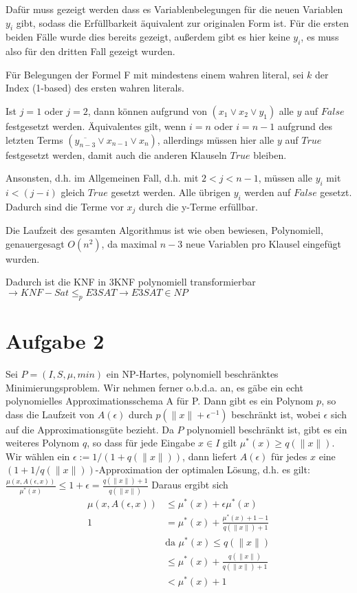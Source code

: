 \documentclass[a4paper,10pt,oneside,reqno]{scrartcl}
\begin{document}
Dafür muss gezeigt werden dass es Variablenbelegungen für die neuen Variablen $y_i$ gibt, sodass die Erfüllbarkeit äquivalent zur originalen Form ist. Für die ersten beiden Fälle wurde dies bereits gezeigt, außerdem gibt es hier keine $y_i$, es muss also für den dritten Fall gezeigt wurden.

Für Belegungen der Formel F mit mindestens einem wahren literal, sei $k$ der Index (1-based) des ersten wahren literals.

Ist $j=1$ oder $j=2$, dann können aufgrund von $(x_1 \vee x_2 \vee y_1)$ alle $y$ auf $False$ festgesetzt werden.
Äquivalentes gilt, wenn $i=n$ oder $i=n-1$ aufgrund des letzten Terms $(\overline{y_{n-3}} \vee x_{n-1} \vee x_{n})$, allerdings müssen hier alle $y$ auf $True$ festgesetzt werden, damit auch die anderen Klauseln $True$ bleiben.

Ansonsten, d.h. im Allgemeinen Fall, d.h. mit $2 < j < n-1$, müssen alle $y_i$ mit $i < (j-i)$ gleich $True$ gesetzt werden. Alle übrigen $y_i$ werden auf $False$ gesetzt. Dadurch sind die Terme vor $x_j$ durch die y-Terme erfüllbar.

Die Laufzeit des gesamten Algorithmus ist wie oben bewiesen, Polynomiell, genauergesagt $O(n^2)$, da maximal $n-3$ neue Variablen pro Klausel eingefügt wurden.

Dadurch ist die KNF in 3KNF polynomiell transformierbar $\rightarrow KNF-Sat \leq_p E3SAT \rightarrow E3SAT \in NP$

\section*{Aufgabe 2}%
Sei $P = (I, S, \mu, min)$ ein $\mathrm{NP}$-Hartes, polynomiell beschränktes Minimierungsproblem. Wir nehmen ferner o.b.d.a. an, es gäbe ein echt polynomielles Approximationsschema A für P. Dann gibt es ein Polynom $p$, so dass die Laufzeit von $A(\epsilon)$ durch $p(\lVert x \rVert + \epsilon^{-1})$ beschränkt ist, wobei $\epsilon$ sich auf die Approximationsgüte bezieht. Da $P$ polynomiell beschränkt ist, gibt es ein weiteres Polynom $q$, so dass für jede Eingabe $x\in I$ gilt $\mu^*(x) \geq q(\lVert x \rVert)$. Wir wählen ein $\epsilon := 1/(1+q(\lVert x\rVert))$, dann liefert $A(\epsilon)$ für jedes $x$ eine $(1 + 1/q(\lVert x\rVert))$-Approximation der optimalen
Lösung, d.h. es gilt:
$\frac{\mu(x,A(\epsilon,x))}{\mu^*(x)} \leq 1 + \epsilon = \frac{q(\lVert x\rVert) + 1}{q(\lVert x\rVert)}$
Daraus ergibt sich \begin{align}
              \mu(x,A(\epsilon,x)) &\leq \mu^*(x) + \epsilon\mu^*(x) \\1
              & = \mu^*(x) + \frac{\mu^*(x) + 1 - 1}{q(\lVert x\rVert) + 1} \\
              & \text{da } \mu^*(x) \leq q(\lVert x\rVert) \\
              & \leq \mu^*(x) + \frac{q(\lVert x\rVert)}{q(\lVert x\rVert) + 1} \\
              & < \mu^*(x) + 1
             \end{align}
\end{document}

